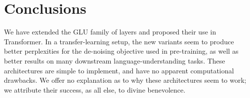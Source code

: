 \documentclass{article}
\begin{document}
\begin{table}[h]
\caption{SQuAD \citep{rajpurkar2016squad} v1.1 (dev).}
\label{tab:squad}
\begin{center}
\vspace{-2mm}
\end{center}
\end{table}

\section{Conclusions}
We have extended the GLU family of layers and proposed their use in Transformer.  In a transfer-learning setup, the new variants seem to produce better perplexities for the de-noising objective used in pre-training, as well as better results on many downstream language-understanding tasks.  These architectures are simple to implement, and have no apparent computational drawbacks.  We offer no explanation as to why these architectures seem to work; we attribute their success, as all else, to divine benevolence.



\end{document}
